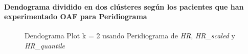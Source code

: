 \paragraph{Dendograma dividido en dos clústeres según los pacientes que han experimentado OAF para Peridiograma}

\begin{figure}[H]
    \centering
    \caption{Dendograma Plot k = 2 usando Peridiograma de \textit{HR}, \textit{HR\_scaled} y \textit{HR\_quantile}}\label{fig:per_ctg_fc}
\end{figure}

